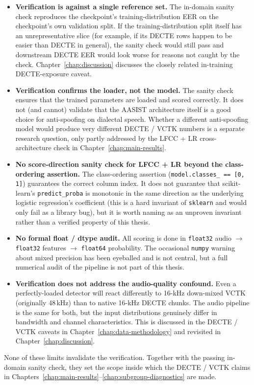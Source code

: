 \begin{itemize}
    \item \textbf{Verification is against a single reference set.} The
        in-domain sanity check reproduces the checkpoint's
        training-distribution EER on the checkpoint's own validation
        split. If the training-distribution split itself has an
        unrepresentative slice (for example, if its DECTE rows happen
        to be easier than DECTE in general), the sanity check would
        still pass and downstream DECTE EER would look worse for
        reasons not caught by the check. Chapter~\ref{chap:discussion}
        discusses the closely related in-training DECTE-exposure caveat.
    \item \textbf{Verification confirms the loader, not the model.} The sanity
        check ensures that the trained parameters are loaded and scored
        correctly. It does not (and cannot) validate that the AASIST
        architecture itself is a good choice for anti-spoofing on
        dialectal speech. Whether a different anti-spoofing model would
        produce very different DECTE / VCTK numbers is a separate
        research question, only partly addressed by the LFCC + LR
        cross-architecture check in Chapter~\ref{chap:main-results}.
    \item \textbf{No score-direction sanity check for LFCC + LR beyond the
        class-ordering assertion.} The class-ordering assertion
        (\texttt{model.classes\_ == [0, 1]}) guarantees the correct column
        index. It does not guarantee that scikit-learn's
        \texttt{predict\_proba} is monotonic in the same direction as the
        underlying logistic regression's coefficient (this is a hard
        invariant of \texttt{sklearn} and would only fail as a library bug),
        but it is worth naming as an unproven invariant rather than a
        verified property of this thesis.
    \item \textbf{No formal float / dtype audit.} All scoring is done in
        \texttt{float32} audio $\rightarrow$ \texttt{float32} features $\rightarrow$ \texttt{float64} probability.
        The occasional \texttt{numpy} warning about mixed precision has been
        eyeballed and is not central, but a full numerical audit
        of the pipeline is not part of this thesis.
    \item \textbf{Verification does not address the audio-quality confound.}
        Even a perfectly-loaded detector will react differently to
        16-kHz down-mixed VCTK (originally 48\,kHz) than to native
        16-kHz DECTE chunks. The audio pipeline is the same for both,
        but the input distributions genuinely differ in bandwidth and
        channel characteristics. This is discussed in the DECTE /
        VCTK caveats in Chapter~\ref{chap:data-methodology} and revisited in Chapter~\ref{chap:discussion}.
\end{itemize}

None of these limits invalidate the verification. Together with
the passing in-domain sanity check, they set the scope inside
which the DECTE / VCTK claims in Chapters~\ref{chap:main-results}--\ref{chap:subgroup-diagnostics} are made.
